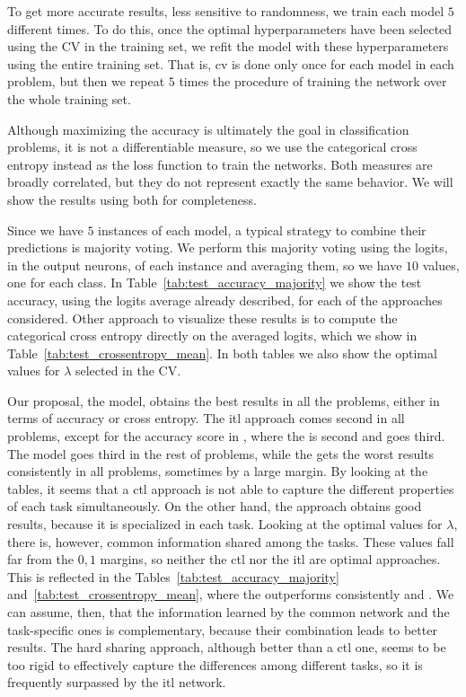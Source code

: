 To get more accurate results, less sensitive to randomness, we train each model $5$ different times. To do this, once the optimal hyperparameters have been selected using the CV in the training set, we refit the model with these hyperparameters using the entire training set. That is, \acrshort{cv} is done only once for each model in each problem, but then we repeat $5$ times the procedure of training the network over the whole training set.

Although maximizing the accuracy is ultimately the goal in classification problems, it is not a differentiable measure, so we use the categorical cross entropy instead as the loss function to train the networks. Both measures are broadly correlated, but they do not represent exactly the same behavior. We will show the results using both for completeness.

Since we have $5$ instances of each model, a typical strategy to combine their predictions is majority voting. We perform this majority voting using the logits, in the output neurons, of each instance and averaging them, so we have $10$ values, one for each class.
In Table~\ref{tab:test_accuracy_majority} we show the test accuracy, using the logits average already described, for each of the approaches considered.
%
Other approach to visualize these results is to compute the categorical cross entropy directly on the averaged logits, which we show in Table~\ref{tab:test_crossentropy_mean}.
%
In both tables we also show the optimal values for $\lambda$ selected in the CV.

Our proposal, the  model, obtains the best results in all the problems, either in terms of accuracy or cross entropy.
The \acrshort{itl} approach comes second in all problems, except for the accuracy score in , where the  is second and  goes third.
The  model goes third in the rest of problems, while the  gets the worst results consistently in all problems, sometimes by a large margin.
%
By looking at the tables, it seems that a \acrshort{ctl} approach is not able to capture the different properties of each task simultaneously. On the other hand, the  approach obtains good results, because it is specialized in each task.
Looking at the optimal values for $\lambda$, there is, however, common information shared among the tasks. These values fall far from the $0, 1$ margins, so neither the \acrshort{ctl} nor the \acrshort{itl} are optimal approaches. This is reflected in the Tables~\ref{tab:test_accuracy_majority} and~\ref{tab:test_crossentropy_mean}, where the  outperforms consistently  and . We can assume, then, that the information learned by the common network and the task-specific ones is complementary, because their combination leads to better results.
%
The hard sharing approach, although better than a \acrshort{ctl} one, seems to be too rigid to effectively capture the differences among different tasks, so it is frequently surpassed by the \acrshort{itl} network.




